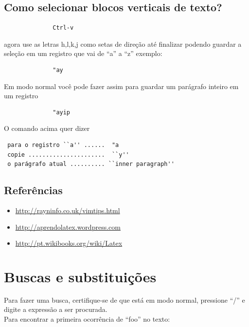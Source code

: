 \documentclass[10pt,a4paper,openany]{book}
\begin{document}
\section{Como selecionar blocos verticais de texto?}
\label{Como selecionar blocos verticais de texto?}

\begin{verbatim}
			  Ctrl-v
\end{verbatim}

agora use as letras h,l,k,j como setas de direção até finalizar
podendo guardar a seleção em um registro que vai de ``a'' a ``z'' exemplo:

\begin{verbatim}
			  "ay
\end{verbatim}

Em modo normal você pode fazer assim para guardar um parágrafo inteiro em um registro

\begin{verbatim}
			  "ayip
\end{verbatim}

O comando acima quer dizer

\begin{verbatim}
 para o registro ``a'' ......  "a
 copie ......................  ``y''
 o parágrafo atual .......... ``inner paragraph''
\end{verbatim}

\section{Referências}
\label{Referências}

\begin{itemize}
	\item \url{http://rayninfo.co.uk/vimtips.html}
	\item \url{http://aprendolatex.wordpress.com}
	\item \url{http://pt.wikibooks.org/wiki/Latex}
\end{itemize}

\chapter{Buscas e substituições}\label{Buscas e substituições}

Para fazer uma busca, certifique-se de que está em modo normal,
pressione ``/'' e digite a expressão a ser procurada. \\


Para encontrar a primeira ocorrência de ``foo'' no texto:
\end{document}
